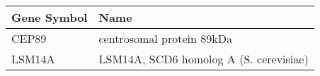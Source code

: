 \begin{tabular}{ll}
\toprule
Gene Symbol &                                   Name \\
\midrule
      CEP89 &              centrosomal protein 89kDa \\
     LSM14A & LSM14A, SCD6 homolog A (S. cerevisiae) \\
\bottomrule
\end{tabular}
